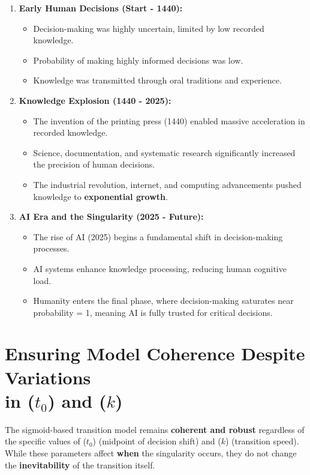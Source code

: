 \documentclass[a4]{article}
\begin{document}
\begin{enumerate}[1.]
\item {\bf Early Human Decisions (Start - 1440):}

\begin{itemize}
\item Decision-making was highly uncertain, limited by low recorded knowledge.
\item Probability of making highly informed decisions was low.
\item Knowledge was transmitted through oral traditions and experience.
\end{itemize}

\item {\bf Knowledge Explosion (1440 - 2025):}

\begin{itemize}
\item The invention of the printing press (1440) enabled massive acceleration in recorded knowledge.
\item Science, documentation, and systematic research significantly increased the precision of human decisions.
\item  The industrial revolution, internet, and computing advancements pushed knowledge to {\bf exponential growth}.
\end{itemize}

\item {\bf AI Era and the Singularity (2025 - Future):}

\begin{itemize}
\item The rise of AI (2025) begins a fundamental shift in decision-making processes.
\item  AI systems enhance knowledge processing, reducing human cognitive load.
\item  Humanity enters the final phase, where decision-making saturates near probability = 1, meaning AI is fully trusted for critical decisions.
\end{itemize}
\end{enumerate}

\section*{Ensuring Model Coherence Despite Variations\\ in ($t_0$) and ($k$)}

The sigmoid-based transition model remains {\bf coherent and robust} regardless of the specific values of ($t_0$) (midpoint of decision shift) and ($k$) (transition speed). While these parameters affect {\bf when} the singularity occurs, they do not change the {\bf inevitability} of the transition itself.  
\end{document}
